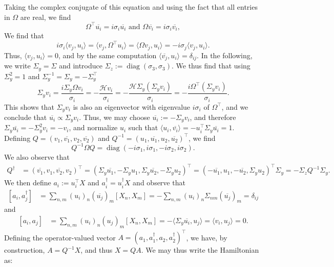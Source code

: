 \documentclass[11pt]{amsart}
\newcommand{\1}{\mathbbm{1}}
\theoremstyle{plain}
\theoremstyle{definition}
\theoremstyle{remark}
\numberwithin{equation}{section}
\begin{document}
\noindent Taking the complex conjugate of this equation and using the fact that all entries in $\Omega$ are real, we find 
\[ \Omega^{\top}\overline{u_i} = i\sigma_i \overline{u_i} \text{ and } \Omega \overline{v_i} = i\sigma_i \overline{v_i},\]
We find that 
\[ i\sigma_i \langle v_j,u_i \rangle = \langle v_j,\Omega^{\top}u_i\rangle = \langle \Omega v_j,u_i\rangle=-i\sigma_j \langle v_j,u_i \rangle.  \]
Thus, $\langle v_j,u_i\rangle =0$, and by the same computation $\langle \overline{v_j},u_i\rangle =\delta_{ij}.$
In the following, we write $\Sigma_y = \Sigma$ and introduce $\Sigma_{z}:=\operatorname{diag}(\sigma_3,\sigma_3).$ We thus find that using $\Sigma_y^2 = 1$ and $\Sigma_y^{-1} = \Sigma_y =- \Sigma_y^{\top}$
\[\Sigma_y v_i = \frac{i\Sigma_y\Omega v_i}{\sigma_i} =-\frac{\mathcal H v_i}{\sigma_i} = -\frac{\mathcal H \Sigma_y (\Sigma_y v_i)}{\sigma_i} = -\frac{i\Omega^{\top} (\Sigma_y v_i)}{\sigma_i}.  \]
This shows that $\Sigma_y v_i$ is also an eigenvector with eigenvalue $i \sigma_i$ of $\Omega^{\top}$, and we conclude that $\overline{u_i} \propto \Sigma_y v_i.$ Thus, we may choose $\overline{u_i}:=-\Sigma_y v_i$, and therefore $\Sigma_y \overline{u_i} = -\Sigma_y^2 v_i = -v_i$, and normalize $u_i$ such that $\langle u_i,\overline{v_i} \rangle =-u_i^{\top}\Sigma_y \overline{u_i}=1.$
Defining $Q=(v_1,\overline{v_1},v_2,\overline{v_2})$ and $Q^{-1}= (u_1,\overline{u_1},u_2,\overline{u_2})^{\top}$, we find 
\[ Q^{-1}\Omega Q = \operatorname{diag}(-i\sigma_1,i\sigma_1,-i\sigma_2,i\sigma_2).\]
We also observe that
\[\begin{split} Q^{\dagger} &= (\overline{v_1}, v_1,\overline{v_2},v_2)^{\top} = (\Sigma_y \overline{u_1},-\Sigma_y u_1,\Sigma_y \overline{u_2},-\Sigma_y u_2)^{\top} =( -\overline{u_1}, u_1, -\overline{u_2},\Sigma_y u_2)^{\top}\Sigma_y= -\Sigma_z Q^{-1} \Sigma_y  .
\end{split} \]
We then define $a_i :=u_i^{\top} X$ and $a_i^{\dagger}=  u_i^{\dagger} X $ and observe that \[\begin{split} [a_i,a_j^{\dagger}]&=\sum_{n,m} (u_i)_n (\overline{u_j})_m [X_n,X_m] =- \sum_{n,m} (u_i)_n \Sigma_{nm}(\overline{u_j})_m =\delta_{ij} 
\end{split}\] and
\[\begin{split}  [a_i,a_j]&=\sum_{n,m} (u_i)_n (u_j)_m [X_n,X_m]=-\langle \Sigma_y\overline{u_i}, u_j \rangle =\langle v_i, u_j \rangle =0.  \end{split}\] 
Defining the operator-valued vector $A=(a_1,a_1^{\dagger},a_2,a_2^{\dagger})^{\top}$, we have, by construction, $A= Q^{-1}X$, and thus $X=QA.$ We may thus write the Hamiltonian as: 
\end{document}
